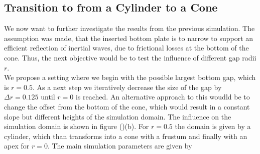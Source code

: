 \subsection{Transition to from a Cylinder to a Cone}

We now want to further investigate the results from the previous simulation.
The assumption was made, that the inserted bottom plate is to narrow to support an efficient reflection
of inertial waves, due to frictional losses at the bottom of the cone. Thus, the next objective would be to
test the influence of different gap radii $r$.\\
We propose a setting where we begin with the possible largest bottom gap, which is $r=0.5$.
As a next step we iteratively decrease the size of the gap by $\Delta r = 0.125$ until $r=0$ is reached.
An alternative approach to this woudld be to change the offset from the bottom of the cone, which would result in a constant
slope but different heights of the simulation domain.
The influence on the simulation domain is shown in figure ()(b).
For $r=0.5$ the domain is given by a cylinder, which than transforms into a cone with a frustum and finally with an apex for $r=0$.
The main simulation parameters are given by

